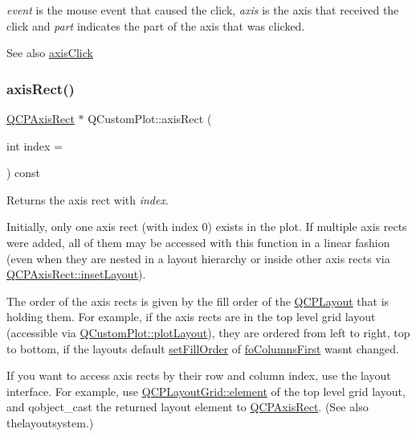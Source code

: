 {\itshape event} is the mouse event that caused the click, {\itshape axis} is the axis that received the click and {\itshape part} indicates the part of the axis that was clicked.

\begin{DoxySeeAlso}{See also}
\hyperlink{classQCustomPlot_abf635f8b56ab5c16d5de9f358543e82b}{axis\+Click} 
\end{DoxySeeAlso}
\mbox{\label{classQCustomPlot_ae5eefcb5f6ca26689b1fd4f6e25b42f9}} 
\subsubsection{\texorpdfstring{axis\+Rect()}{axisRect()}}
{\footnotesize\ttfamily \hyperlink{classQCPAxisRect}{Q\+C\+P\+Axis\+Rect} $\ast$ Q\+Custom\+Plot\+::axis\+Rect (\begin{DoxyParamCaption}\item[{int}]{index = {} }\end{DoxyParamCaption}) const}

Returns the axis rect with {\itshape index}.

Initially, only one axis rect (with index 0) exists in the plot. If multiple axis rects were added, all of them may be accessed with this function in a linear fashion (even when they are nested in a layout hierarchy or inside other axis rects via \hyperlink{classQCPAxisRect_a949f803466619924c7018df4b511ae10}{Q\+C\+P\+Axis\+Rect\+::inset\+Layout}).

The order of the axis rects is given by the fill order of the \hyperlink{classQCPLayout}{Q\+C\+P\+Layout} that is holding them. For example, if the axis rects are in the top level grid layout (accessible via \hyperlink{classQCustomPlot_af1a1f1f571237deb7c2bd34a5e9f018f}{Q\+Custom\+Plot\+::plot\+Layout}), they are ordered from left to right, top to bottom, if the layout\textquotesingle{}s default \hyperlink{classQCPLayoutGrid_affc2f3cfd22f28698c5b29b960d2a391}{set\+Fill\+Order} of \hyperlink{classQCPLayoutGrid_a7d49ee08773de6b2fd246edfed353ccaac4cb4b796ec4822d5894b47b51627fb3}{fo\+Columns\+First} wasn\textquotesingle{}t changed.

If you want to access axis rects by their row and column index, use the layout interface. For example, use \hyperlink{classQCPLayoutGrid_a602b426609b4411cf6a93c3ddf3a381a}{Q\+C\+P\+Layout\+Grid\+::element} of the top level grid layout, and {\ttfamily qobject\+\_\+cast} the returned layout element to \hyperlink{classQCPAxisRect}{Q\+C\+P\+Axis\+Rect}. (See also thelayoutsystem.)

